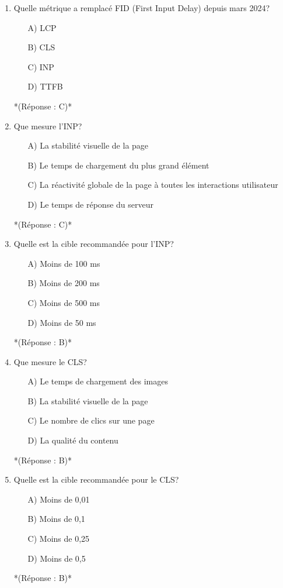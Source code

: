 \documentclass[12pt,a4paper,twoside]{report}
\begin{document}
\begin{enumerate}
\item Quelle métrique a remplacé FID (First Input Delay) depuis mars 2024?
\begin{itemize}
\item[A)] LCP
\item[B)] CLS
\item[C)] INP
\item[D)] TTFB
\end{itemize}
*(Réponse : C)*

\item Que mesure l'INP?
\begin{itemize}
\item[A)] La stabilité visuelle de la page
\item[B)] Le temps de chargement du plus grand élément
\item[C)] La réactivité globale de la page à toutes les interactions utilisateur
\item[D)] Le temps de réponse du serveur
\end{itemize}
*(Réponse : C)*

\item Quelle est la cible recommandée pour l'INP?
\begin{itemize}
\item[A)] Moins de 100 ms
\item[B)] Moins de 200 ms
\item[C)] Moins de 500 ms
\item[D)] Moins de 50 ms
\end{itemize}
*(Réponse : B)*

\item Que mesure le CLS?
\begin{itemize}
\item[A)] Le temps de chargement des images
\item[B)] La stabilité visuelle de la page
\item[C)] Le nombre de clics sur une page
\item[D)] La qualité du contenu
\end{itemize}
*(Réponse : B)*

\item Quelle est la cible recommandée pour le CLS?
\begin{itemize}
\item[A)] Moins de 0,01
\item[B)] Moins de 0,1
\item[C)] Moins de 0,25
\item[D)] Moins de 0,5
\end{itemize}
*(Réponse : B)*


\end{enumerate}
\end{document}
